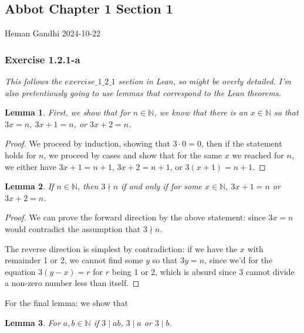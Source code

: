 \documentclass{article}
\newcommand{\N}{\mathbb{N}}
\newtheorem*{lemma}{Lemma}
\begin{document}
\begin{center}
\subsection*{Abbot Chapter 1 Section 1}
\end{center}

Heman Gandhi
\hfill
2024-10-22\\

\subsubsection*{Exercise 1.2.1-a}

\textit{This follows the $exercise\_1\_2\_1$ section in Lean, so might be overly detailed. I'm also pretentiously going to use lemmas that correspond to the Lean theorems.}

\begin{lemma}
First, we show that for $n \in \N$, we know that there is an $x \in \N$ so that $3x = n$,
$3x + 1 = n$, or $3x + 2 = n$.
\end{lemma}

\begin{proof}
We proceed by induction, showing that $3 \cdot 0 = 0$, then
if the statement holds for $n$, we proceed by cases and show that for the same $x$ we reached for
$n$, we either have $3x + 1 = n + 1$, $3x + 2 = n + 1$, or $3(x + 1) = n + 1$.
\end{proof}

\begin{lemma}
If $n \in \N$, then $3 \nmid n$ if and only if for some $x \in \N$, $3x + 1 = n$
or $3x + 2 = n$.
\end{lemma}

\begin{proof}
We can prove the forward direction by the above statement: since $3x = n$ would contradict
the assumption that $3 \nmid n$.

The reverse direction is simplest by contradiction: if we have the $x$ with
remainder 1 or 2, we cannot find some $y$ so that $3y = n$, since we'd for the equation $3(y - x) = r$ for $r$
being 1 or 2, which is absurd since 3 cannot divide a non-zero number less than itself.
\end{proof}

For the final lemma: we show that

\begin{lemma}
For $a, b \in \N$ if $3 \mid ab$, $3 \mid a$ or $3 \mid b$.
\end{lemma}
\end{document}
